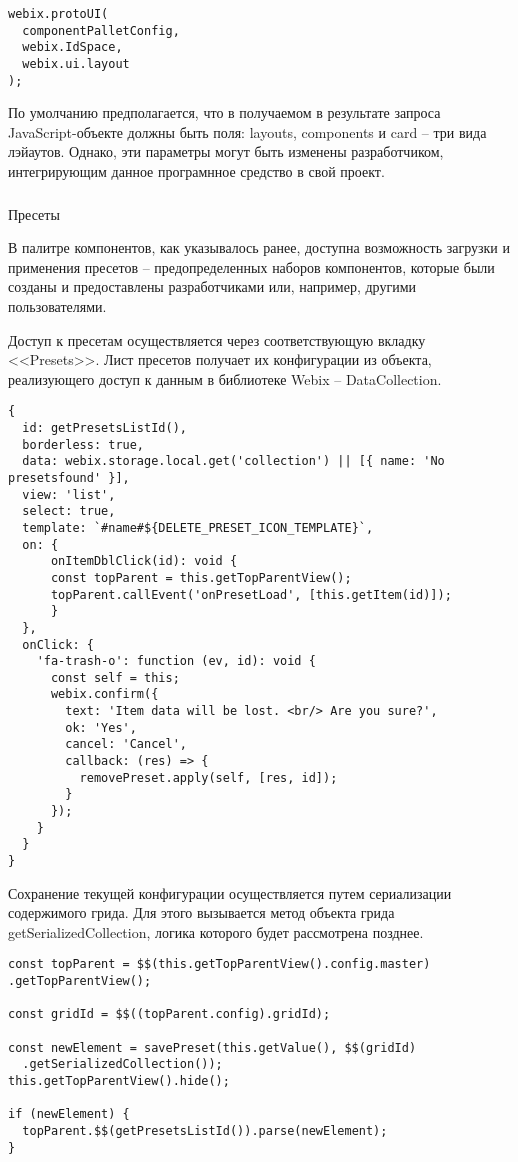 \begin{lstlisting}
webix.protoUI(
  componentPalletConfig,
  webix.IdSpace,
  webix.ui.layout
);
\end{lstlisting}

По умолчанию предполагается, что в получаемом в результате запроса JavaScript-объекте должны быть поля: layouts, components и card -- три вида лэйаутов. Однако, эти параметры могут быть изменены разработчиком, интегрирующим данное програмнное средство в свой проект.

\subsubsection{}Пресеты
\

В палитре компонентов, как указывалось ранее, доступна возможность загрузки и применения пресетов -- предопределенных наборов компонентов, которые были созданы и предоставлены разработчиками или, например, другими пользователями.

Доступ к пресетам осуществляется через соответствующую вкладку <<Presets>>. Лист пресетов получает их конфигурации из объекта, реализующего доступ к данным в библиотеке Webix -- DataCollection.

\begin{lstlisting}
{
  id: getPresetsListId(),
  borderless: true,
  data: webix.storage.local.get('collection') || [{ name: 'No presetsfound' }],
  view: 'list',
  select: true,
  template: `#name#${DELETE_PRESET_ICON_TEMPLATE}`,
  on: {
      onItemDblClick(id): void {
      const topParent = this.getTopParentView();
      topParent.callEvent('onPresetLoad', [this.getItem(id)]);
      }
  },
  onClick: {
    'fa-trash-o': function (ev, id): void {
      const self = this;
      webix.confirm({
        text: 'Item data will be lost. <br/> Are you sure?',
        ok: 'Yes',
        cancel: 'Cancel',
        callback: (res) => {
          removePreset.apply(self, [res, id]);
        }
      });
    }
  }
}
\end{lstlisting}

Сохранение текущей конфигурации осуществляется путем сериализации содержимого грида. Для этого вызывается метод объекта грида getSerializedCollection, логика которого будет рассмотрена позднее.

\begin{lstlisting}
const topParent = $$(this.getTopParentView().config.master)
.getTopParentView();

const gridId = $$((topParent.config).gridId);

const newElement = savePreset(this.getValue(), $$(gridId)
  .getSerializedCollection());
this.getTopParentView().hide();

if (newElement) {
  topParent.$$(getPresetsListId()).parse(newElement);
}
\end{lstlisting}

